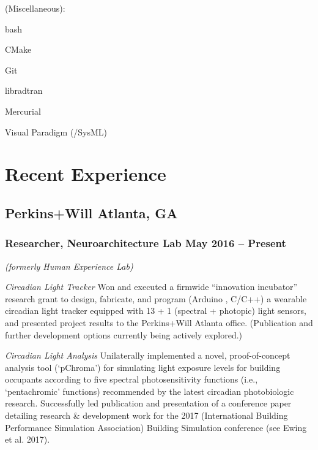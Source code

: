 \documentclass[letterpaper, oneside, 10pt]{article}
\begin{document}
\begin{multicols}{2}
{  {\jostmedium (Miscellaneous):}%
    \begin{itemize*}[%
      label=\relax, labelwidth=0pt, itemjoin=\space\char"00B7%
    ]%
      \item bash%
      \item CMake%
      \item Git%
      \item {}%
      \item libradtran%
      \item Mercurial%
      \item {}%
      \item Visual Paradigm (/SysML)%
    \end{itemize*}
  }
\end{multicols}

\section*{Recent Experience} %

\hfill
\vspace{-24pt}

\subsection*{Perkins+Will\DotSep{0.25em} Atlanta, GA}
\subsubsection*{Researcher, Neuroarchitecture Lab\DotSep{0.25em} May 2016 -- Present}

%
\DotSep{0.25em} \textit{(formerly Human Experience Lab)}%


\textit{Circadian Light Tracker}\DotSep{0.25em}
Won and executed a firmwide ``innovation incubator'' research grant to
design, fabricate, and program (Arduino , C/C++) a
wearable circadian light tracker equipped with 13 + 1 (spectral +
photopic) light sensors, and presented project results to the Perkins+Will
Atlanta office. (Publication and further development options currently
being actively explored.)

\textit{Circadian Light Analysis}\DotSep{0.25em}
Unilaterally implemented a novel, proof-of-concept analysis tool
(`pChroma') for simulating light exposure levels for building occupants
according to five spectral photosensitivity functions (i.e., `pentachromic'
functions) recommended by the latest circadian photobiologic research.
Successfully led publication and presentation of a conference paper
detailing research \& development work for the 2017 
(International Building Performance Simulation Association) Building
Simulation conference (see Ewing et al. 2017).
\end{document}
